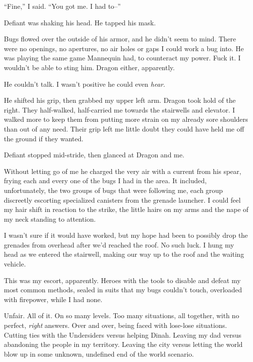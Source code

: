 ``Fine,'' I said.  ``You got me.  I had to--''



Defiant was shaking his head.  He tapped his mask.



Bugs flowed over the outside of his armor, and he didn't seem to mind.  There were no openings, no apertures, no air holes or gaps I could work a bug into.  He was playing the same game Mannequin had, to counteract my power.  Fuck it.  I wouldn't be able to sting him.  Dragon either, apparently.



He couldn't talk.  I wasn't positive he could even \emph{hear}.



He shifted his grip, then grabbed my upper left arm.  Dragon took hold of the right.  They half-walked, half-carried me towards the stairwells and elevator.  I walked more to keep them from putting more strain on my already sore shoulders than out of any need.  Their grip left me little doubt they could have held me off the ground if they wanted.



Defiant stopped mid-stride, then glanced at Dragon and me.



Without letting go of me he charged the very air with a current from his spear, frying each and every one of the bugs I had in the area.  It included, unfortunately, the two groups of bugs that were following me, each group discreetly escorting specialized canisters from the grenade launcher.  I could feel my hair shift in reaction to the strike, the little hairs on my arms and the nape of my neck standing to attention.



I wasn't sure if it would have worked, but my hope had been to possibly drop the grenades from overhead after we'd reached the roof.  No such luck.  I hung my head as we entered the stairwell, making our way up to the roof and the waiting vehicle.



This was my escort, apparently.  Heroes with the tools to disable and defeat my most common methods, sealed in suits that my bugs couldn't touch, overloaded with firepower, while I had none.



Unfair.  All of it.  On so many levels.  Too many situations, all together, with no perfect, \emph{right} answers.  Over and over, being faced with lose-lose situations.  Cutting ties with the Undersiders versus helping Dinah.  Leaving my dad versus abandoning the people in my territory.  Leaving the city versus letting the world blow up in some unknown, undefined end of the world scenario.



